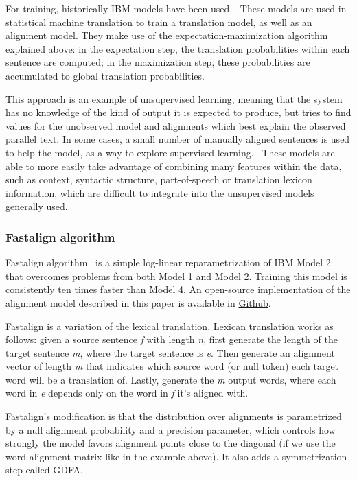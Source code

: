 For training, historically IBM models have been used.~\cite{koehn2009statistical} These models are used in statistical machine translation to train a translation model, as well as an alignment model. They make use of the expectation-maximization algorithm explained above: in the expectation step, the translation probabilities within each sentence are computed; in the maximization step, these probabilities are accumulated to global translation probabilities.

This approach is an example of unsupervised learning, meaning that the system has no knowledge of the kind of output it is expected to produce, but tries to find values for the unobserved model and alignments which best explain the observed parallel text. In some cases, a small number of manually aligned sentences is used to help the model, as a way to explore supervised learning.~\cite{varga2007parallel} These models are able to more easily take advantage of combining many features within the data, such as context, syntactic structure, part-of-speech or translation lexicon information, which are difficult to integrate into the unsupervised models generally used.

\subsubsection{Fastalign algorithm}

Fastalign algorithm~\cite{dyer-etal-2013-simple} is a simple log-linear reparametrization of IBM Model 2 that overcomes problems from both Model 1 and Model 2. Training this model is consistently ten times faster than Model 4. An open-source implementation of the alignment model described in this paper is available in \href{http://github.com/clab/fast align}{Github}.

Fastalign is a variation of the lexical translation. Lexican translation works as follows: given a source sentence \emph{f} with length \emph{n}, first generate the length of the target sentence \emph{m}, where the target sentence is \emph{e}. Then generate an alignment vector of length \emph{m} that indicates which source word (or null token) each target word will be a translation of. Lastly, generate the \emph{m} output words, where each word in \emph{e} depends only on the word in \emph{f} it's aligned with.

Fastalign's modification is that the distribution over alignments is parametrized by a null alignment probability and a precision parameter, which controls how strongly the model favors alignment points close to the diagonal (if we use the word alignment matrix like in the example above). It also adds a symmetrization step called GDFA.

